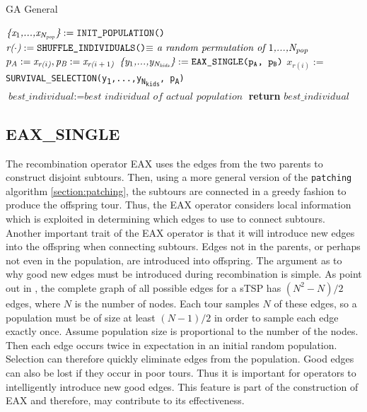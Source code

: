 \begin{algorithm}
\caption{GA General}\label{alg:gagen}
\begin{algorithmic}[1]
\State $\textit{\{x\textsubscript{$1$},...,x\textsubscript{N\textsubscript{pop}}\}} := \texttt{INIT\_POPULATION()}$
	\State $\textit{r($\cdot$)} := \texttt{SHUFFLE\_INDIVIDUALS()} \textit{$\equiv$ a random permutation of $1$,...,N\textsubscript{pop} } $
		\State $p_A := \textit{x\textsubscript{r($i$)}} , \textit{p\textsubscript{B}} := \textit{x\textsubscript{r($i+1$)}} $
		\State $\textit{\{y\textsubscript{$1$},...,y\textsubscript{N\textsubscript{kids}}\}} := \texttt{EAX\_SINGLE(p\textsubscript{A}, p\textsubscript{B})}$
		\State $x_{r(i)} :=$ \texttt{SURVIVAL\_SELECTION(y\textsubscript1,...,y\textsubscript{N\textsubscript{kids}}, p\textsubscript{A})}
	\EndFor
	\State $\textit{best\_individual} := \textit{best individual of actual population}$
\EndWhile
\State \textbf{return} $best\_individual$
\EndProcedure
\end{algorithmic}
\end{algorithm}

\subsection{EAX\_SINGLE}
The recombination operator EAX uses the edges from the two parents to construct disjoint subtours.
Then, using a more general version of the \texttt{patching} algorithm \ref{section:patching}, the subtours are connected in a greedy fashion to produce the offspring tour. Thus, the EAX operator considers local information which is exploited in determining which edges to use to connect subtours.\\
Another important trait of the EAX operator is that it will introduce new edges into the offspring when connecting subtours. Edges not in the parents, or perhaps not even in the population, are introduced into offspring. 
The argument as to why good new edges must be introduced during recombination is simple. As point out in \cite{Mathias92geneticoperators}, the complete graph of all possible edges for a sTSP has $(N^2-N)/2$ edges, where $N$ is the number of nodes. Each tour samples $N$ of these edges, so a population must be of size at least $(N-1)/2$ in order to sample each edge exactly once.
Assume population size is proportional to the number of the nodes. Then each edge occurs twice in expectation in an initial random population. Selection can therefore quickly eliminate edges from the population. Good edges can also be lost if they occur in poor tours. Thus it is important for operators to intelligently introduce new good edges. This feature is part of the construction of EAX and therefore, may contribute to its effectiveness.

